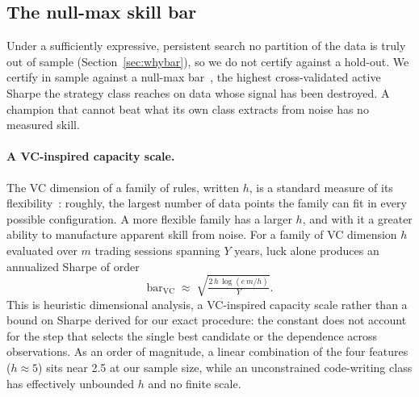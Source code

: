\documentclass[11pt]{article}
\begin{document}
\subsection{The null-max skill bar}
\label{sec:bar}

Under a sufficiently expressive, persistent search no partition of the data is truly out of sample
(Section~\ref{sec:whybar}), so we do not certify against a hold-out. We certify in sample against a
null-max bar~\cite{nullmax}, the highest cross-validated active Sharpe the strategy class reaches on
data whose signal has been destroyed. A champion that cannot beat what its own class extracts from
noise has no measured skill.

\paragraph{A VC-inspired capacity scale.} The VC dimension of a family of rules, written $h$, is a
standard measure of its flexibility~\cite{vapnik}: roughly, the largest number of data points the family
can fit in every possible configuration. A more flexible family has a larger $h$, and with it a greater
ability to manufacture apparent skill from noise. For a family of VC dimension $h$ evaluated over $m$
trading sessions spanning $Y$ years, luck alone produces an annualized Sharpe of order
\begin{equation}
\mathrm{bar}_{\mathrm{VC}} \;\approx\; \sqrt{\tfrac{2\,h\,\log(e\,m/h)}{Y}} .
\label{eq:vc}
\end{equation}
This is heuristic dimensional analysis, a VC-inspired capacity scale rather than a bound on Sharpe
derived for our exact procedure: the constant does not account for the step that selects the single best candidate or the
dependence across observations. As an order of magnitude, a linear combination of the four features
($h\approx 5$) sits near 2.5 at our sample size, while an unconstrained code-writing class has
effectively unbounded $h$ and no finite scale.
\end{document}
